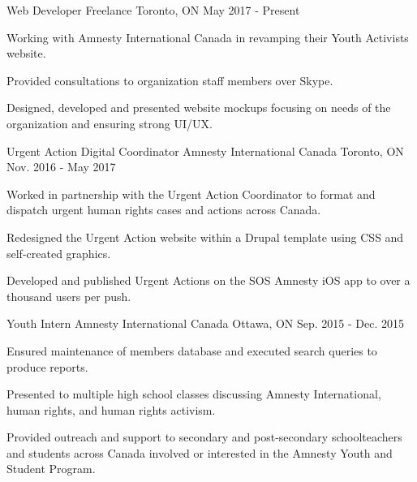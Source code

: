 

\begin{cventries}

  \cventry
    {Web Developer} %
    {Freelance} %
    {Toronto, ON} %
    {May 2017 - Present} %
    {
      \begin{cvitems} %
        \item {Working with Amnesty International Canada in revamping their Youth Activists website.}
        \item {Provided consultations to organization staff members over Skype.}
        \item {Designed, developed and presented website mockups focusing on needs of the organization and ensuring strong UI/UX.}
      \end{cvitems}
    }

  \cventry
    {Urgent Action Digital Coordinator} %
    {Amnesty International Canada} %
    {Toronto, ON} %
    {Nov. 2016 - May 2017} %
    {
      \begin{cvitems} %
        \item {Worked in partnership with the Urgent Action Coordinator to format and dispatch urgent human rights cases and actions across Canada.}
        \item {Redesigned the Urgent Action website within a Drupal template using CSS and self-created graphics. }
        \item {Developed and published Urgent Actions on the SOS Amnesty iOS app to over a thousand users per push.}
      \end{cvitems}
    }

  \cventry
    {Youth Intern} %
    {Amnesty International Canada} %
    {Ottawa, ON} %
    {Sep. 2015 - Dec. 2015} %
    {
      \begin{cvitems} %
        \item {Ensured maintenance of members database and executed search queries to produce reports.}
        \item {Presented to multiple high school classes discussing Amnesty International, human rights, and human rights activism.}
        \item {Provided outreach and support to secondary and post-secondary schoolteachers and students across Canada involved or interested in the Amnesty Youth and Student Program.}
      \end{cvitems}
    }
    

\end{cventries}
